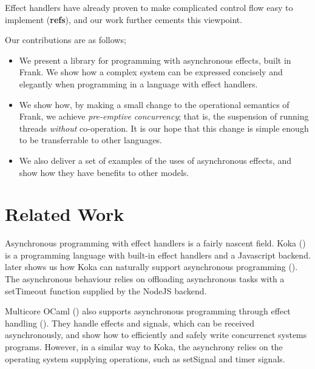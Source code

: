 \documentclass[msc,deptreport,cs]{infthesis} %
\newcommand{\todo}[1]
           {{\par\noindent\small\color{RoyalPurple}
  \framebox{\parbox{\dimexpr\linewidth-2\fboxsep-2\fboxrule}
    {\textbf{TODO:} #1}}}}
\begin{document}

Effect handlers have
already proven to make complicated control flow easy to implement
(\textbf{refs}), and our work further cements this viewpoint.

Our contributions are as follows;

\begin{itemize}
\item We present a library for programming with asynchronous effects, built in
  Frank. We show how a complex system can be expressed concisely and elegantly
  when programming in a language with effect handlers.

\item We show how, by making a small change to the operational semantics of
  Frank, we achieve \emph{pre-emptive concurrency}; that is, the suspension of
  running threads \emph{without} co-operation. It is our hope that this change
  is simple enough to be transferrable to other languages.

\item We also deliver a set of examples of the uses of asynchronous effects, and
  show how they have benefits to other models.
\end{itemize}

\section{Related Work}

Asynchronous programming with effect handlers is a fairly nascent field.
%
Koka (\cite{leijen2014koka}) is a programming language with built-in effect
handlers and a Javascript backend. \citeauthor{leijen2017structured} later shows
us how Koka can naturally support asynchronous programming
(\cite{leijen2017structured}). The asynchronous behaviour relies on offloading
asynchronous tasks with a \textsf{setTimeout} function supplied by the NodeJS
backend.

Multicore OCaml (\cite{dolan2014multicore}) also supports asynchronous
programming through effect handling (\cite{dolan2017concurrent}). They handle
effects and signals, which can be received asynchronously, and show how to
efficiently and safely write concurrenct systems programs. However, in a similar
way to Koka, the asynchrony relies on the operating system supplying operations,
such as \textsf{setSignal} and \textsf{timer} signals.
\end{document}
